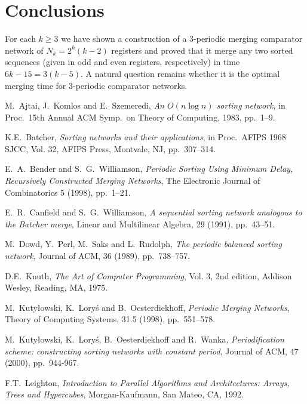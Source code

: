\documentclass{llncs}
\begin{document}
\section{Conclusions}

For each $k \ge 3$ we have shown a construction of a 3-periodic merging
comparator network of $N_k = 2^k(k-2)$ registers and proved that it merge any
two sorted sequences (given in odd and even registers, respectively) in time
$6k-15 = 3(k-5)$. A natural question remains whether it is the optimal merging
time for 3-periodic comparator networks.

\begin{thebibliography}{99} 

 {\sc M.~Ajtai, J.~Komlos and E.~Szemeredi}, {\em An $O(n
  \log n)$ sorting network}, in Proc.\ 15th Annual ACM Symp.\ on Theory
  of Computing, 1983, pp.~1--9.

 {\sc K.E.~Batcher}, {\em Sorting networks and their
  applications}, in Proc.\ AFIPS 1968 SJCC, Vol. 32, AFIPS Press,
  Montvale, NJ, pp.~307--314.

 {\sc E.~A.~Bender and S.~G.~Williamson}, {\em  Periodic
  Sorting Using Minimum Delay, Recursively Constructed Merging
  Networks}, The Electronic Journal of Combinatorics 5 (1998), pp.~1--21.

 {\sc E.~R.~Canfield and S.~G.~Williamson}, {\em A
  sequential sorting network analogous to the Batcher merge}, Linear and
  Multilinear Algebra, 29 (1991), pp.~43--51.

 {\sc M.~Dowd, Y.~Perl, M.~Saks and L.~Rudolph}, {\em The
  periodic balanced sorting network}, Journal of ACM, 36 (1989),
  pp.~738--757.

 {\sc D.E.~Knuth}, {\em The Art of Computer Programming},
  Vol. 3, 2nd edition, Addison Wesley, Reading, MA, 1975.

 {\sc M.~Kuty{\l}owski, K.~Lory{\'s} and
  B.~Oesterdiekhoff}, {\em Periodic Merging Networks}, Theory of
  Computing Systems, 31.5 (1998), pp.~551--578.

 {\sc M.~Kuty{\l}owski, K.~Lory{\'s}, B.~Oesterdiekhoff
  and R.~Wanka}, {\em Periodification scheme: constructing sorting
  networks with constant period}, Journal of ACM, 47 (2000),
  pp.~944-967. 

 {\sc F.T.~Leighton}, {\em Introduction to Parallel
  Algorithms and Architectures{\rm :} Arrays, Trees and Hypercubes},
  Morgan-Kaufmann, San Mateo, CA, 1992.
  

\end{thebibliography}
\end{document}
